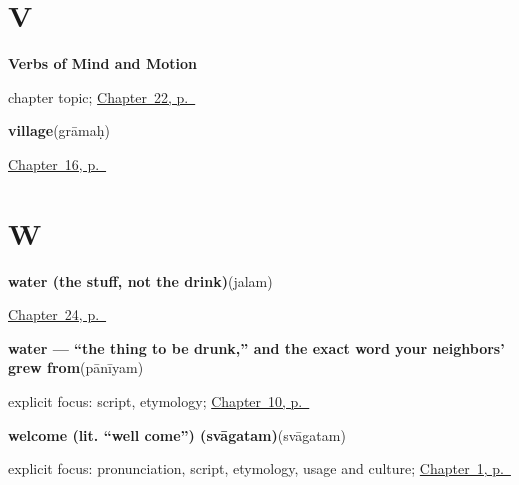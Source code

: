 \section*{V}

\noindent\begin{minipage}[t]{\linewidth}
\raggedright
\textbf{Verbs of Mind and Motion}\par
\footnotesize chapter topic; \hyperref[ch:sa-verbs-of-mind]{Chapter~22, p.~\pageref*{ch:sa-verbs-of-mind}}
\end{minipage}\par\smallskip

\noindent\begin{minipage}[t]{\linewidth}
\raggedright
\textbf{village}\enspace\emph{}\enspace(grāmaḥ)\par
\footnotesize \hyperref[ch:sa-places]{Chapter~16, p.~\pageref*{ch:sa-places}}
\end{minipage}\par\smallskip

\section*{W}

\noindent\begin{minipage}[t]{\linewidth}
\raggedright
\textbf{water (the stuff, not the drink)}\enspace\emph{}\enspace(jalam)\par
\footnotesize \hyperref[ch:sa-ask-for]{Chapter~24, p.~\pageref*{ch:sa-ask-for}}
\end{minipage}\par\smallskip

\noindent\begin{minipage}[t]{\linewidth}
\raggedright
\textbf{water — \textquotedblleft{}the thing to be drunk,\textquotedblright{} and the exact word your neighbors'  grew from}\enspace\emph{}\enspace(pānīyam)\par
\footnotesize explicit focus: script, etymology; \hyperref[ch:sa-request-nouns]{Chapter~10, p.~\pageref*{ch:sa-request-nouns}}
\end{minipage}\par\smallskip

\noindent\begin{minipage}[t]{\linewidth}
\raggedright
\textbf{welcome (lit. \textquotedblleft{}well come\textquotedblright{}) (svāgatam)}\enspace\emph{}\enspace(svāgatam)\par
\footnotesize explicit focus: pronunciation, script, etymology, usage and culture; \hyperref[ch:greetings]{Chapter~1, p.~\pageref*{ch:greetings}}
\end{minipage}\par\smallskip

